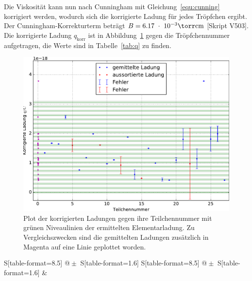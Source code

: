 Die Viskosität kann nun nach Cunningham mit Gleichung~\eqref{equ:cunning} korrigiert werden, wodurch sich die korrigierte Ladung für jedes Tröpfchen ergibt. Der Cunningham-Korrekturterm beträgt $B = 6.17~\cdot~10^{-3} \si{\torr\cm}$ [Skript V503]. Die korrigierte Ladung $q_{\mathrm{korr}}$ ist in Abbildung~\ref{fig:ladung} gegen die Tröpfchennummer aufgetragen, die Werte sind in Tabelle~\ref{tab:q} zu finden.

\begin{figure}[H]
  \centering
  \includegraphics[width=0.5\textheight]{../plots/ladung3.pdf}
  \caption{Plot der korrigierten Ladungen gegen ihre Teilchennummer mit grünen Niveaulinien der ermittelten Elementarladung. Zu Vergleichszwecken sind die gemittelten Ladungen zusätzlich in Magenta auf eine Linie geplottet worden.}
\label{fig:ladung}
\end{figure}

\begin{table}[H]
  \centering
  \caption{Gemittelte Ladungen $q$ und korrigierte Ladungen $q_{\mathrm{korr}}$.}
\label{tab:q}
  \begin{tabular}{
      S[table-format=8.5]
      @{${}\pm{}$}
      S[table-format=1.6]
      S[table-format=8.5]
      @{${}\pm{}$}
      S[table-format=1.6]
      }
      \toprule
       & \\
      \midrule
      \bottomrule
  \end{tabular}
\end{table}

